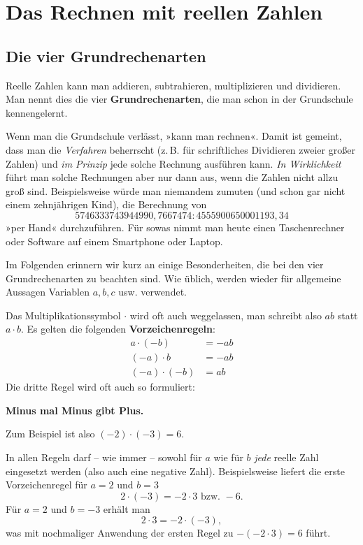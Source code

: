 \section{Das Rechnen mit reellen Zahlen}

\subsection{Die vier Grundrechenarten}

Reelle Zahlen kann man addieren, subtrahieren, multiplizieren und dividieren. Man nennt dies die vier \textbf{Grundrechenarten}, die man schon in der Grundschule kennengelernt.

Wenn man die Grundschule verlässt, »kann man rechnen«. Damit ist gemeint, dass man die \emph{Verfahren} beherrscht (z.\,B. für schriftliches Dividieren zweier großer Zahlen) und \emph{im Prinzip} jede solche Rechnung ausführen kann. \emph{In Wirklichkeit} führt man solche Rechnungen aber nur dann aus, wenn die Zahlen nicht allzu groß sind. Beispielsweise würde man niemandem zumuten (und schon gar nicht einem zehnjährigen Kind), die Berechnung von
\[ 5746333743944990{,}7667474 : 4555900650001193{,}34 \]
»per Hand« durchzuführen. Für sowas nimmt man heute einen Taschenrechner oder Software auf einem Smartphone oder Laptop.

Im Folgenden erinnern wir kurz an einige Besonderheiten, die bei den vier Grundrechenarten zu beachten sind. Wie üblich, werden wieder für allgemeine Aussagen Variablen $a, b, c$ usw. verwendet.


Das Multiplikationssymbol $\cdot$ wird oft auch weggelassen, man schreibt also $ab$ statt $a \cdot b$. Es gelten die folgenden \textbf{Vorzeichenregeln}:
\begin{align*}
  a \cdot (-b) &= -ab\\
  (-a) \cdot b &= -ab\\
  (-a) \cdot (-b) &= ab
\end{align*}
Die dritte Regel wird oft auch so formuliert:
\begin{center}\textbf{Minus mal Minus gibt Plus.}\end{center}

Zum Beispiel ist also $(-2) \cdot (-3) = 6$.

In allen Regeln darf -- wie immer -- sowohl für $a$ wie für $b$ \emph{jede} reelle Zahl eingesetzt werden (also auch eine negative Zahl). Beispielsweise liefert die erste Vorzeichenregel für $a = 2$ und $b = 3$
\[ 2 \cdot (-3) = -2 \cdot 3 \text{ bzw. } -6 . \]
Für $a = 2$ und $b = -3$ erhält man
\[ 2 \cdot 3 = -2 \cdot (-3) , \]
was mit nochmaliger Anwendung der ersten Regel zu $-(-2 \cdot 3) = 6$ führt.

